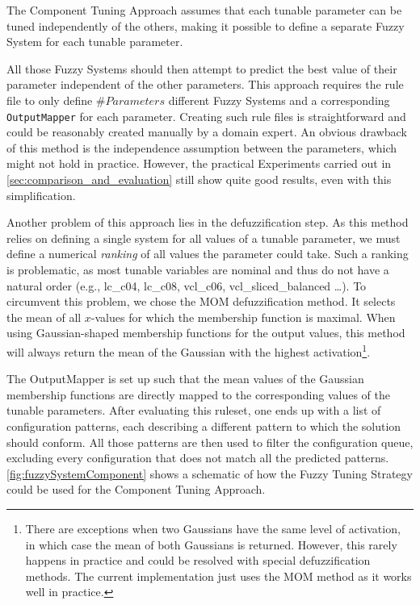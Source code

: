The Component Tuning Approach assumes that each tunable parameter can be tuned independently of the others, making it possible to define a separate Fuzzy System for each tunable parameter.

All those Fuzzy Systems should then attempt to predict the best value of their parameter independent of the other parameters. This approach requires the rule file to only define $\#Parameters$ different Fuzzy Systems and a corresponding \texttt{OutputMapper} for each parameter. Creating such rule files is straightforward and could be reasonably created manually by a domain expert. An obvious drawback of this method is the independence assumption between the parameters, which might not hold in practice. However, the practical Experiments carried out in \autoref{sec:comparison_and_evaluation} still show quite good results, even with this simplification.

Another problem of this approach lies in the defuzzification step. As this method relies on defining a single system for all values of a tunable parameter, we must define a numerical \emph{ranking} of all values the parameter could take. Such a ranking is problematic, as most tunable variables are nominal and thus do not have a natural order (e.g., lc\_c04, lc\_c08, vcl\_c06, vcl\_sliced\_balanced \dots ). To circumvent this problem, we chose the MOM defuzzification method. It selects the mean of all $x$-values for which the membership function is maximal. When using Gaussian-shaped membership functions for the output values, this method will always return the mean of the Gaussian with the highest activation\footnote{There are exceptions when two Gaussians have the same level of activation, in which case the mean of both Gaussians is returned. However, this rarely happens in practice and could be resolved with special defuzzification methods. The current implementation just uses the MOM method as it works well in practice.}.

The OutputMapper is set up such that the mean values of the Gaussian membership functions are directly mapped to the corresponding values of the tunable parameters. After evaluating this ruleset, one ends up with a list of configuration patterns, each describing a different pattern to which the solution should conform. All those patterns are then used to filter the configuration queue, excluding every configuration that does not match all the predicted patterns. \autoref{fig:fuzzySystemComponent} shows a schematic of how the Fuzzy Tuning Strategy could be used for the Component Tuning Approach.


